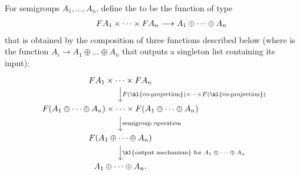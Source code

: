 \AP For semigroups $A_1,\ldots,A_n$, define the  to be the 
function of type 
\begin{align*}
\qquad\functor A_1 \times \cdots \times \functor A_n \longrightarrow A_1 \oplus \cdots \oplus A_n
\end{align*}
that is obtained by the composition of three functions described below (where  is the function $A_i \to A_1 \oplus \dots \oplus A_n$ that outputs a singleton list containing its input):
\[
\begin{tikzcd}
\functor A_1 \times \cdots \times \functor A_n
\ar[d,"\functor(\text{\kl{co-projection}}) \times \cdots \times \functor(\text{\kl{co-projection}})"]
\\
\functor(A_1 \oplus \cdots \oplus A_n)
\times
\cdots
\times 
\functor(A_1 \oplus \cdots \oplus A_n)
\ar[d,"\text{semigroup operation}"]
\\
\functor(A_1 \oplus \cdots \oplus A_n)
\ar[d, "\text{\kl{output mechanism} for $A_1 \oplus \cdots \oplus A_n$}"]\\ 
A_1 \oplus \cdots \oplus A_n.
\end{tikzcd}
\]

